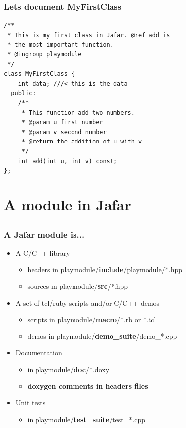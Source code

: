 \documentclass[compress]{beamer}
\begin{document}
\begin{frame}[fragile]
  \frametitle{Lets document MyFirstClass}
  \begin{lstlisting}
/**
 * This is my first class in Jafar. @ref add is
 * the most important function.
 * @ingroup playmodule
 */
class MyFirstClass {
	int data; ///< this is the data
  public:
    /**
     * This function add two numbers.
     * @param u first number
     * @param v second number
     * @return the addition of u with v
     */
    int add(int u, int v) const;
};
  \end{lstlisting}
\end{frame}



\section{A module in Jafar}
\subsection*{}

\begin{frame}[fragile]
  \frametitle{A Jafar module is...}
  \begin{itemize}
   \item<1-> A C/C++ library
		\begin{itemize}
			\item headers in playmodule/\textbf{include}/playmodule/*.hpp
			\item sources in playmodule/\textbf{src}/*.hpp
		\end{itemize}
   \item<2-> A set of tcl/ruby scripts and/or C/C++ demos\\
		\begin{itemize}
			\item scripts in playmodule/\textbf{macro}/*.rb or *.tcl
			\item demos in playmodule/\textbf{demo\_suite}/demo\_*.cpp
		\end{itemize}
   \item<3-> Documentation
		\begin{itemize}
			\item in playmodule/\textbf{doc}/*.doxy
			\item \textbf{doxygen comments in headers files}
		\end{itemize}
   \item<4-> Unit tests
		\begin{itemize}
			\item in playmodule/\textbf{test\_suite}/test\_*.cpp
		\end{itemize}
  \end{itemize}
\end{frame}
\end{document}
